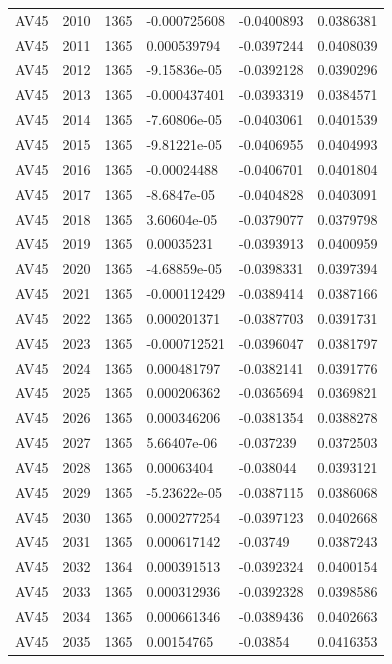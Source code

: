 \begin{longtable}{llllll}
AV45 & 2010 & 1365 & -0.000725608 & -0.0400893 & 0.0386381 \\
AV45 & 2011 & 1365 & 0.000539794 & -0.0397244 & 0.0408039 \\
AV45 & 2012 & 1365 & -9.15836e-05 & -0.0392128 & 0.0390296 \\
AV45 & 2013 & 1365 & -0.000437401 & -0.0393319 & 0.0384571 \\
AV45 & 2014 & 1365 & -7.60806e-05 & -0.0403061 & 0.0401539 \\
AV45 & 2015 & 1365 & -9.81221e-05 & -0.0406955 & 0.0404993 \\
AV45 & 2016 & 1365 & -0.00024488 & -0.0406701 & 0.0401804 \\
AV45 & 2017 & 1365 & -8.6847e-05 & -0.0404828 & 0.0403091 \\
AV45 & 2018 & 1365 & 3.60604e-05 & -0.0379077 & 0.0379798 \\
AV45 & 2019 & 1365 & 0.00035231 & -0.0393913 & 0.0400959 \\
AV45 & 2020 & 1365 & -4.68859e-05 & -0.0398331 & 0.0397394 \\
AV45 & 2021 & 1365 & -0.000112429 & -0.0389414 & 0.0387166 \\
AV45 & 2022 & 1365 & 0.000201371 & -0.0387703 & 0.0391731 \\
AV45 & 2023 & 1365 & -0.000712521 & -0.0396047 & 0.0381797 \\
AV45 & 2024 & 1365 & 0.000481797 & -0.0382141 & 0.0391776 \\
AV45 & 2025 & 1365 & 0.000206362 & -0.0365694 & 0.0369821 \\
AV45 & 2026 & 1365 & 0.000346206 & -0.0381354 & 0.0388278 \\
AV45 & 2027 & 1365 & 5.66407e-06 & -0.037239 & 0.0372503 \\
AV45 & 2028 & 1365 & 0.00063404 & -0.038044 & 0.0393121 \\
AV45 & 2029 & 1365 & -5.23622e-05 & -0.0387115 & 0.0386068 \\
AV45 & 2030 & 1365 & 0.000277254 & -0.0397123 & 0.0402668 \\
AV45 & 2031 & 1365 & 0.000617142 & -0.03749 & 0.0387243 \\
AV45 & 2032 & 1364 & 0.000391513 & -0.0392324 & 0.0400154 \\
AV45 & 2033 & 1365 & 0.000312936 & -0.0392328 & 0.0398586 \\
AV45 & 2034 & 1365 & 0.000661346 & -0.0389436 & 0.0402663 \\
AV45 & 2035 & 1365 & 0.00154765 & -0.03854 & 0.0416353 \\

\end{longtable}
